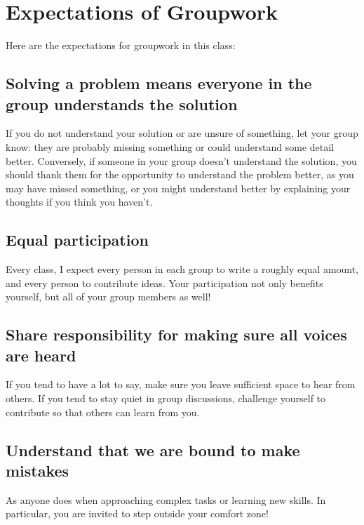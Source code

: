 \documentclass[12pt]{amsart}
\begin{document}
	
	\thispagestyle{empty}
	
	\section*{Expectations of Groupwork}
	
Here are the expectations for groupwork in this class:

\subsection*{Solving a problem means everyone in the group understands the solution}  If you do not understand your solution or are unsure of something, let your group know: they are probably missing something or could understand some detail better. Conversely, if someone in your group doesn't understand the solution, you should thank them for the opportunity to understand the problem better, as you may have missed something, or you might understand better by explaining your thoughts if you think you haven't.

\subsection*{Equal participation} Every class, I expect every person in each group to write a roughly equal amount, and every person to contribute ideas. Your participation not only benefits yourself, but all of your group members as well!


\subsection*{Share responsibility for making sure all voices are heard}
If you tend to have a lot to say, make sure you leave sufficient space to hear from others.  If you tend to stay quiet in group discussions, challenge yourself to contribute so that others can learn from you.

\subsection*{Understand that we are bound to make mistakes} 
As anyone does when approaching complex tasks or learning new skills.
In particular, you are invited to step outside your comfort zone!
\end{document}

